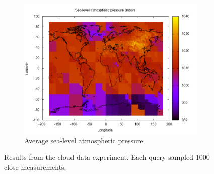 \begin{figure}[H]
\centering
\ContinuedFloat
\begin{subfigure}[b]{1.0\textwidth}
	\includegraphics[width=\textwidth]{img/cloud/pressure}
	\caption{Average sea-level atmospheric pressure}
\end{subfigure}
\caption{Results from the cloud data experiment.
	Each query sampled 1000 close measurements.}
\label{fig:cloud-data}
\end{figure}
